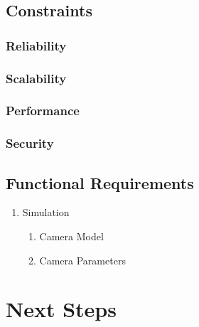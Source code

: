 \documentclass[11pt]{report}
\begin{document}
\section{Constraints}

\subsection{Reliability}

\subsection{Scalability}

\subsection{Performance}

\subsection{Security} 


\section{Functional Requirements}

\begin{enumerate}
\item Simulation
\begin{enumerate}
	\item Camera Model
	\item Camera Parameters 
\end{enumerate}
\end{enumerate}

\chapter{Next Steps}


\listoffigures 

\printglossaries

{}
\end{document}
